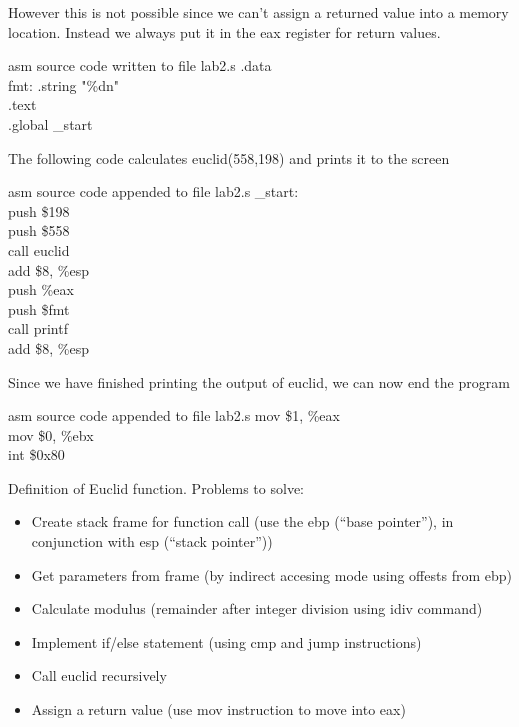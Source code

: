 \documentclass{article}
\begin{document}
However this is not possible since we can't assign a returned value into a memory location. Instead we always put it in the eax register for return values.
\begin{GFT}{asm source code written to file lab2.s}
\+.data \\
\+  fmt: .string "\%d\Backslash{}n" \\
\+.text                 \\
\+.global \_start  \\
\end{GFT}
\clearpage
The following code calculates euclid(558,198) and prints it to the screen
\begin{GFT}{asm source code appended to file lab2.s}
\+\_start:            \\
\+  push \$198        \\
\+  push \$558\\
\+  call euclid      \\
\+  add \$8, \%esp     \\
\+  push \%eax\\
\+  push \$fmt         \\
\+  call printf    \\
\+  add \$8, \%esp\\
\end{GFT}
Since we have finished printing the output of euclid, we can now end the program
\begin{GFT}{asm source code appended to file lab2.s}
\+  mov \$1, \%eax  \\
\+  mov \$0, \%ebx\\
\+  int \$0x80    \\
\end{GFT}
\clearpage
Definition of Euclid function. Problems to solve:
\begin{itemize}
\item Create stack frame for function call (use the ebp (``base pointer''), in conjunction with esp (``stack pointer''))
\item Get parameters from frame (by indirect accesing mode using offests from ebp)
\item Calculate modulus (remainder after integer division using idiv command)
\item Implement if/else statement (using cmp and jump instructions)
\item Call euclid recursively
\item Assign a return value (use mov instruction to move into eax)
\end{itemize}
\end{document}

